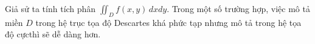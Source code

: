 \documentclass[preview]{standalone}
\begin{document}
\begin{center}
Giả sử ta tính tích phân $\iint_D f(x, y)\,dxdy$. Trong một số trường hợp, việc mô tả miền $D$ trong hệ trục tọa độ Descartes khá phức tạp nhưng mô tả trong  hệ tọa độ cựcthì sẽ dễ dàng hơn.
\end{center}
\end{document}
